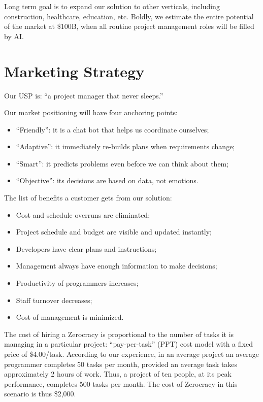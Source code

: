 \documentclass{main}
\begin{document}
Long term goal is to expand our solution to other verticals, including
construction, healthcare, education, etc. Boldly, we estimate the entire
potential of the market at \$100B, when all routine project management roles will
be filled by AI.

\section{Marketing Strategy}

Our USP is: ``a project manager that never sleeps.''

Our market positioning will have four anchoring points:

\begin{itemize}\itemsep0em
  \item ``Friendly'': it is a chat bot that helps us coordinate ourselves;
  \item ``Adaptive'': it immediately re-builds plans when requirements change;
  \item ``Smart'': it predicts problems even before we can think about them;
  \item ``Objective'': its decisions are based on data, not emotions.
\end{itemize}

The list of benefits a customer gets from our solution:

\begin{itemize}\itemsep0em
  \item Cost and schedule overruns are eliminated;
  \item Project schedule and budget are visible and updated instantly;
  \item Developers have clear plans and instructions;
  \item Management always have enough information to make decisions;
  \item Productivity of programmers increases;
  \item Staff turnover decreases;
  \item Cost of management is minimized.
\end{itemize}

The cost of hiring a Zerocracy is proportional to the number of tasks it is
managing in a particular project: ``pay-per-task'' (PPT) cost model with
a fixed price of \$4.00/task. According to our experience, in an average project an average
programmer completes 50 tasks per month, provided an average task takes
approximately 2 hours of work. Thus, a project of ten people, at its peak
performance, completes 500 tasks per month. The cost of Zerocracy in this
scenario is thus \$2,000.
\end{document}
